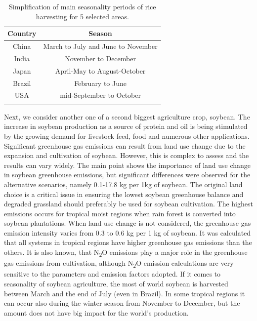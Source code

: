 \vfill

\begin{table}[h!]
	\centering
	\begin{tabular}{c c} 
		\hline
		Country & Season\\ 
		\hline\hline
		China & March to July and June to November \\ 
		India & November to December  \\
		Japan & April-May to August-October \\
		Brazil & February to June \\
		USA &  mid-September to October \\ 
		\hline
		&\\
	\end{tabular}
	\caption{Simplification of main seasonality periods of rice harvesting for 5 selected areas.}
	\label{tab:Seasonality_rice}
\end{table}

Next, we consider another one of a second biggest agriculture crop, soybean. The increase in soybean production as a source of protein and oil is being stimulated by the growing demand for livestock feed, food and numerous other applications. Significant greenhouse gas emissions can result from land use change due to the expansion and cultivation of soybean. However, this is complex to assess and the results can vary widely. The main point shows the importance of land use change in soybean greenhouse emissions, but significant differences were observed for the alternative scenarios, namely 0.1-17.8 kg \co per 1kg of soybean. The original land choice is a critical issue in ensuring the lowest soybean greenhouse balance and degraded grassland should preferably be used for soybean cultivation. The highest emissions occurs for tropical moist regions when rain forest is converted into soybean plantations. When land use change is not considered, the greenhouse gas emission intensity varies from 0.3 to 0.6 kg \co per 1 kg of soybean. It was calculated that all systems in tropical regions have higher greenhouse gas emissions than the others. It is also known, that N\textsubscript{2}O emissions play a major role in the greenhouse gas emissions from cultivation, although N\textsubscript{2}O emission calculations are very sensitive to the parameters and emission factors adopted.
If it comes to seasonality of soybean agriculture, the most of world soybean is harvested between March and the end of July (even in Brazil). In some tropical regions it can occur also during the winter season from November to December, but the amount does not have big impact for the world's production.